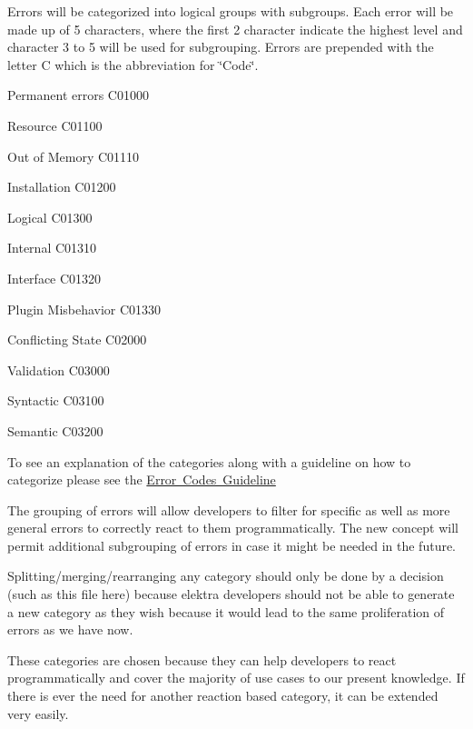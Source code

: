 Errors will be categorized into logical groups with subgroups. Each error will be made up of 5 characters, where the first 2 character indicate the highest level and character 3 to 5 will be used for subgrouping. Errors are prepended with the letter {\ttfamily C} which is the abbreviation for \char`\"{}\+Code\char`\"{}.


\begin{DoxyItemize}
\item Permanent errors C01000
\begin{DoxyItemize}
\item Resource C01100
\begin{DoxyItemize}
\item Out of Memory C01110
\end{DoxyItemize}
\item Installation C01200
\item Logical C01300
\begin{DoxyItemize}
\item Internal C01310
\item Interface C01320
\item Plugin Misbehavior C01330
\end{DoxyItemize}
\end{DoxyItemize}
\item Conflicting State C02000
\item Validation C03000
\begin{DoxyItemize}
\item Syntactic C03100
\item Semantic C03200
\end{DoxyItemize}
\end{DoxyItemize}

To see an explanation of the categories along with a guideline on how to categorize please see the \mbox{\hyperlink{doc_dev_error-categorization_md}{Error Codes Guideline}}

The grouping of errors will allow developers to filter for specific as well as more general errors to correctly react to them programmatically. The new concept will permit additional subgrouping of errors in case it might be needed in the future.

Splitting/merging/rearranging any category should only be done by a decision (such as this file here) because elektra developers should not be able to generate a new category as they wish because it would lead to the same proliferation of errors as we have now.

These categories are chosen because they can help developers to react programmatically and cover the majority of use cases to our present knowledge. If there is ever the need for another reaction based category, it can be extended very easily.

